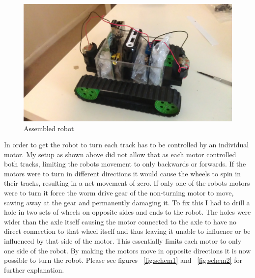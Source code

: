 \documentclass[]{report}   %
\begin{document}
						\begin{figure}[h]
							\caption{Assembled robot}
							\includegraphics[width=\textwidth,height=\textheight,keepaspectratio]{images/nowires}
						\end{figure}
						
						In order to get the robot to turn each track has to be controlled by an individual motor. My setup as shown above did not allow that as each motor controlled
						both tracks, limiting the robots movement to only backwards or forwards. If the motors were to turn in different directions it would
						cause the wheels to spin in their tracks, resulting in a net movement of zero. If only one of the robots motors were to turn it
						force the worm drive gear of the non-turning motor to move, sawing away at the gear and permanently damaging it. To fix this I had to
						drill a hole in two sets of wheels on opposite sides and ends to the robot. The holes were wider than the axle itself causing the motor
						connected to the axle to have no direct connection to that wheel itself and thus leaving it unable to influence or be influenced by that
						side of the motor. This essentially limits each motor to only one side of the robot. By making the motors move in opposite directions it
						is now possible to turn the robot. Please see figures ~\ref{fig:schem1} and ~\ref{fig:schem2} for further explanation.
						
\end{document}
